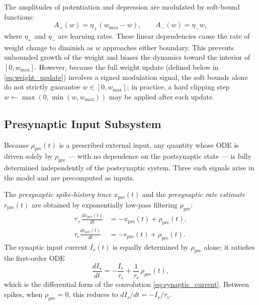 \documentclass[11pt]{article}
\theoremstyle{definition}
\begin{document}
The amplitudes of potentiation and depression are modulated by soft-bound functions:
\begin{equation} \label{eq:soft_bounds}
    A_+(w) = \eta_+ (w_{\mathrm{max}} - w), \qquad A_-(w) = \eta_- w,
\end{equation}
where $\eta_+$ and $\eta_-$ are learning rates. These linear dependencies cause the rate of weight change to diminish as $w$ approaches either boundary. This prevents unbounded growth of the weight and biases the dynamics toward the interior of $[0, w_{\mathrm{max}}]$. However, because the full weight update (defined below in \eqref{eq:weight_update}) involves a signed modulation signal, the soft bounds alone do not strictly guarantee $w \in [0, w_{\mathrm{max}}]$; in practice, a hard clipping step $w \leftarrow \max(0, \min(w, w_{\mathrm{max}}))$ may be applied after each update.

\subsection{Presynaptic Input Subsystem} \label{sec:input_subsystem}

Because $\rho_{\mathrm{pre}}(t)$ is a prescribed external input, any quantity whose ODE is driven solely by $\rho_{\mathrm{pre}}$ — with no dependence on the postsynaptic state — is fully determined independently of the postsynaptic system. Three such signals arise in the model and are precomputed as inputs.

The \textit{presynaptic spike-history trace} $x_{\mathrm{pre}}(t)$ and the \textit{presynaptic rate estimate} $r_{\mathrm{pre}}(t)$ are obtained by exponentially low-pass filtering $\rho_{\mathrm{pre}}$:
\begin{align}
    \tau_+ \frac{dx_{\mathrm{pre}}(t)}{dt} &= -x_{\mathrm{pre}}(t) + \rho_{\mathrm{pre}}(t), \label{eq:pre_trace} \\
    \tau_r \frac{dr_{\mathrm{pre}}(t)}{dt} &= -r_{\mathrm{pre}}(t) + \rho_{\mathrm{pre}}(t). \label{eq:rate_pre}
\end{align}
The synaptic input current $I_s(t)$ is equally determined by $\rho_{\mathrm{pre}}$ alone; it satisfies the first-order ODE
\begin{equation} \label{eq:syn_current_ode}
    \frac{dI_s}{dt} = -\frac{I_s}{\tau_s} + \frac{1}{\tau_s}\,\rho_{\mathrm{pre}}(t),
\end{equation}
which is the differential form of the convolution \eqref{eq:synaptic_current}. Between spikes, when $\rho_{\mathrm{pre}} = 0$, this reduces to $dI_s/dt = -I_s/\tau_s$.
\end{document}
